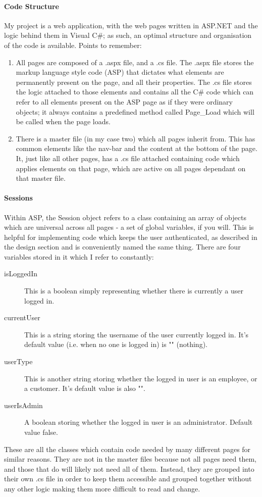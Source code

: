 ﻿\documentclass{article}
\begin{document}
    \paragraph{Code Structure}
    My project is a web application, with the web pages written in ASP.NET and the logic behind them in Visual C\#; as such, an optimal structure and organisation of the code is available.
    Points to remember:
    \begin{enumerate}
        \item All pages are composed of a .aspx file, and a .cs file.
        The .aspx file stores the markup language style code (ASP) that dictates what elements are permanently present on the page, and all their properties.
        The .cs file stores the logic attached to those elements and contains all the C\# code which can refer to all elements present on the ASP page as if they were ordinary objects; it always contains a predefined method called Page_Load which will be called when the page loads.
        \item There is a master file (in my case two) which all pages inherit from.
        This has common elements like the nav-bar and the content at the bottom of the page.
        It, just like all other pages, has a .cs file attached containing code which applies elements on that page, which are active on all pages dependant on that master file.        
    \end{enumerate}
    \paragraph{Sessions}
    Within ASP, the Session object refers to a class containing an array of objects which are universal across all pages - a set of global variables, if you will.
    This is helpful for implementing code which keeps the user authenticated, as described in the design section and is conveniently named the same thing.
    There are four variables stored in it which I refer to constantly:
    \begin{description}
        \item[isLoggedIn] This is a boolean simply representing whether there is currently a user logged in.
        \item[currentUser] This is a string storing the username of the user currently logged in.
        It's default value (i.e. when no one is logged in) is "" (nothing).
        \item[userType] This is another string storing whether the logged in user is an employee, or a customer.
        It's default value is also "".
        \item[userIsAdmin] A boolean storing whether the logged in user is an administrator.
        Default value false.
    \end{description}
    \newpage
    These are all the classes which contain code needed by many different pages for similar reasons.
    They are not in the master files because not all pages need them, and those that do will likely not need all of them.
    Instead, they are grouped into their own .cs file in order to keep them accessible and grouped together without any other logic making them more difficult to read and change.
\end{document}
